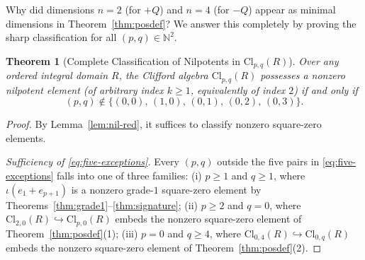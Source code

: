 \documentclass[11pt]{article}
\newtheorem{theorem}{Theorem}[section]
\theoremstyle{definition}
\newcommand{\Cl}{\mathrm{Cl}}
\begin{document}
Why did dimensions $n = 2$ (for $+Q$) and $n = 4$ (for $-Q$) appear as minimal dimensions
in Theorem~\ref{thm:posdef}? We answer this completely by proving the sharp classification
for all $(p, q) \in \mathbb{N}^2$.

\begin{theorem}[Complete Classification of Nilpotents in $\Cl_{p,q}(R)$]\label{thm:classification}
Over any ordered integral domain $R$, the Clifford algebra $\Cl_{p,q}(R)$ possesses a
nonzero nilpotent element (of arbitrary index $k \ge 1$, equivalently of index $2$) if and
only if
\begin{equation}\label{eq:five-exceptions}
  (p, q) \notin \bigl\{(0, 0),\, (1, 0),\, (0, 1),\, (0, 2),\, (0, 3)\bigr\}.
\end{equation}
\end{theorem}
\begin{proof}
By Lemma~\ref{lem:nil-red}, it suffices to classify nonzero square-zero elements.

\smallskip
\noindent\emph{Sufficiency of \eqref{eq:five-exceptions}.}
Every $(p, q)$ outside the five pairs in \eqref{eq:five-exceptions} falls into one of
three families:
(i) $p \ge 1$ and $q \ge 1$, where $\iota(e_1 + e_{p+1})$ is a nonzero grade-$1$
square-zero element by Theorems~\ref{thm:grade1}--\ref{thm:signature};
(ii) $p \ge 2$ and $q = 0$, where $\Cl_{2,0}(R) \hookrightarrow \Cl_{p,0}(R)$ embeds the
nonzero square-zero element of Theorem~\ref{thm:posdef}(1);
(iii) $p = 0$ and $q \ge 4$, where $\Cl_{0,4}(R) \hookrightarrow \Cl_{0,q}(R)$ embeds the
nonzero square-zero element of Theorem~\ref{thm:posdef}(2).


\end{proof}
\end{document}

